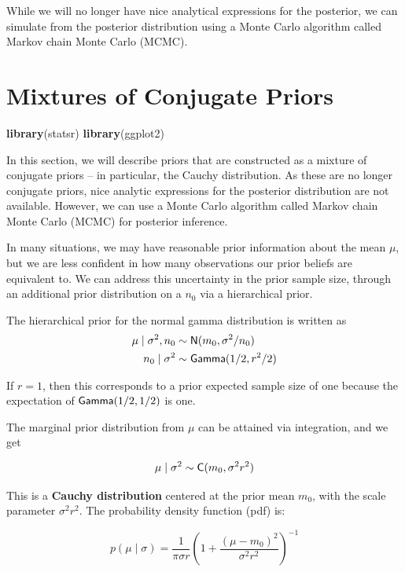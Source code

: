 \documentclass[]{book}
\newenvironment{Shaded}{\begin{snugshade}}{\end{snugshade}}
\newcommand{\KeywordTok}[1]{\textcolor[rgb]{0.13,0.29,0.53}{\textbf{{#1}}}}
\newcommand{\NormalTok}[1]{{#1}}
\theoremstyle{definition}
\theoremstyle{definition}
\theoremstyle{definition}
\theoremstyle{remark}
\begin{document}
While we will no longer have nice analytical expressions for the
posterior, we can simulate from the posterior distribution using a Monte
Carlo algorithm called Markov chain Monte Carlo (MCMC).

\section{Mixtures of Conjugate Priors}\label{sec:NG-Cauchy}

\begin{Shaded}
\begin{Highlighting}[]
\KeywordTok{library}\NormalTok{(statsr)}
\KeywordTok{library}\NormalTok{(ggplot2)}
\end{Highlighting}
\end{Shaded}

In this section, we will describe priors that are constructed as a
mixture of conjugate priors -- in particular, the Cauchy distribution.
As these are no longer conjugate priors, nice analytic expressions for
the posterior distribution are not available. However, we can use a
Monte Carlo algorithm called Markov chain Monte Carlo (MCMC) for
posterior inference.

In many situations, we may have reasonable prior information about the
mean \(\mu\), but we are less confident in how many observations our
prior beliefs are equivalent to. We can address this uncertainty in the
prior sample size, through an additional prior distribution on a \(n_0\)
via a hierarchical prior.

The hierarchical prior for the normal gamma distribution is written as
\[\begin{aligned}
\mu \mid \sigma^2, n_0 & \sim \textsf{N}(m_0, \sigma^2/n_0) \\
n_0 \mid \sigma^2 &  \sim \textsf{Gamma}(1/2, r^2/2)
\end{aligned}\]

If \(r=1\), then this corresponds to a prior expected sample size of one
because the expectation of \(\textsf{Gamma}(1/2,1/2)\) is one.

The marginal prior distribution from \(\mu\) can be attained via
integration, and we get

\[\mu \mid \sigma^2  \sim  \textsf{C}(m_0, \sigma^2 r^2)\]

This is a \textbf{Cauchy distribution} centered at the prior mean
\(m_0\), with the scale parameter \(\sigma^2 r^2\). The probability
density function (pdf) is:

\[p(\mu \mid \sigma) = \frac{1}{\pi \sigma r} \left( 1 +  \frac{(\mu - m_0)^2} {\sigma^2 r^2}  \right)^{-1}\]
\end{document}
